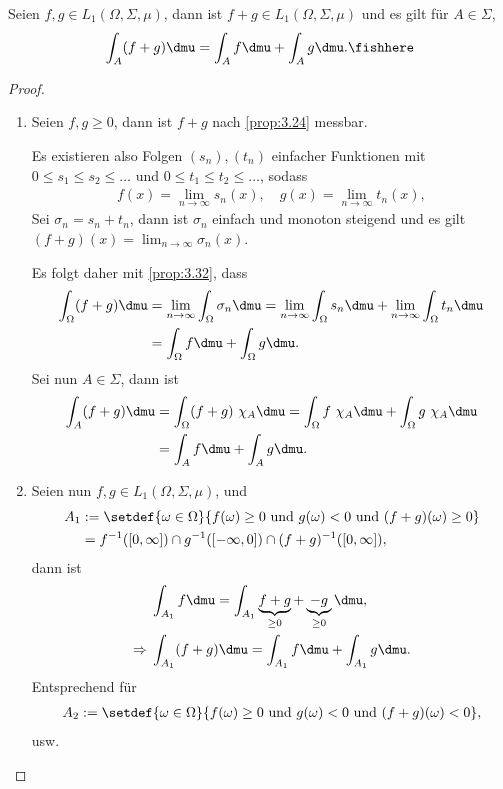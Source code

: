 \begin{prop}[Additivität]
\label{prop:3.33}
Seien $f,g\in L_1(\Omega,\Sigma,\mu)$, dann ist $f+g\in L_1(\Omega,\Sigma,\mu)$
und es gilt für $A\in\Sigma$,
\begin{align*}
\int_A (f+g) \dmu = \int_A f\dmu + \int_A g\dmu.\fishhere 
\end{align*}
\end{prop}
\begin{proof} 
\begin{enumerate}[label=\arabic{*}.)]
  \item Seien $f,g\ge 0$, dann ist $f+g$ nach \ref{prop:3.24} messbar.
  
  Es existieren also Folgen $(s_n), (t_n)$ einfacher Funktionen mit $0\le s_1\le
  s_2\le \ldots$ und $0\le t_1\le t_2\le \ldots$, sodass
  \begin{align*}
  f(x) = \lim\limits_{n\to\infty} s_n(x),\quad   g(x) = \lim\limits_{n\to\infty} t_n(x),
  \end{align*}
Sei $\sigma_n = s_n+t_n$, dann ist $\sigma_n$ einfach und monoton steigend und
es gilt $(f+g)(x) = \lim_{n\to\infty} \sigma_n(x)$.

Es folgt daher mit \ref{prop:3.32}, dass
\begin{align*}
\int_\Omega (f+g) \dmu &= \lim\limits_{n\to\infty}\int_\Omega \sigma_n \dmu
= \lim\limits_{n\to\infty}\int_\Omega s_n \dmu +
\lim\limits_{n\to\infty}\int_\Omega t_n \dmu
\\ &= \int_\Omega f \dmu + \int_\Omega g\dmu.
\end{align*}
Sei nun $A\in\Sigma$, dann ist
\begin{align*}
\int_A (f+g)\dmu &= \int_\Omega (f+g)\ \chi_A \dmu = \int_\Omega f\ \chi_A\dmu +
\int_\Omega g\ \chi_A \dmu \\ &= \int_A f \dmu + \int_A g\dmu.
\end{align*}
\item Seien nun $f,g\in L_1(\Omega,\Sigma,\mu)$, und
\begin{align*}
A_1 &:= \setdef{\omega\in\Omega}{f(\omega)\ge 0 \text{ und } g(\omega) < 0
\text{ und } (f+g)(\omega) \ge 0}\\
&= f^{-1}([0,\infty]) \cap g^{-1}([-\infty,0])\cap (f+g)^{-1}([0,\infty]),
\end{align*}
dann ist
\begin{align*}
&\int_{A_1} f\dmu = \int_{A_1} \underbrace{f+g}_{\ge 0} + \underbrace{-g}_{\ge
0} \dmu,\\
\Rightarrow\; & \int_{A_1} (f+g)\dmu = \int_{A_1} f\dmu + \int_{A_1} g\dmu.
\end{align*}
Entsprechend für
\begin{align*}
A_2 := \setdef{\omega\in\Omega}{f(\omega)\ge 0 \text{ und } g(\omega) < 0
\text{ und } (f+g)(\omega) < 0},
\end{align*}
usw.\qedhere
\end{enumerate}
\end{proof}

